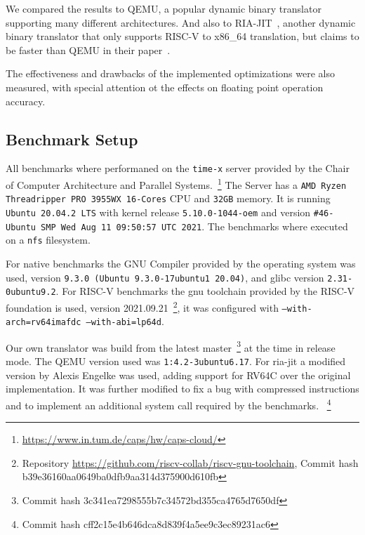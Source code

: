 \documentclass[course=eragp]{aspdoc}
\begin{document}
\par

We compared the results to QEMU, a popular dynamic binary translator supporting many different architectures.
And also to RIA-JIT~\cite{ria_jit_repo}, another dynamic binary translator that only supports RISC-V to x86\_64 translation, but claims to be faster than QEMU in their paper~\cite{ria_jit_paper}.

\par

The effectiveness and drawbacks of the implemented optimizations were also measured, with special attention ot the effects on floating point operation accuracy.

\subsection{Benchmark Setup}

All benchmarks where performaned on the \texttt{time-x} server provided by the Chair of Computer Architecture and Parallel Systems.~\footnote{\url{https://www.in.tum.de/caps/hw/caps-cloud/}} %
The Server has a \texttt{AMD Ryzen Threadripper PRO 3955WX 16-Cores} CPU and \texttt{32GB} memory.
It is running \texttt{Ubuntu 20.04.2 LTS} with kernel release \texttt{5.10.0-1044-oem} and version \texttt{\#46-Ubuntu SMP Wed Aug 11 09:50:57 UTC 2021}.
The benchmarks where executed on a \texttt{nfs} filesystem.

For native benchmarks the GNU Compiler provided by the operating system was used,
version \texttt{9.3.0 (Ubuntu 9.3.0-17ubuntu1~20.04)}, and glibc version \texttt{2.31-0ubuntu9.2}.
For RISC-V benchmarks the gnu toolchain provided by the RISC-V foundation is used, version 2021.09.21~\footnote{Repository \url{https://github.com/riscv-collab/riscv-gnu-toolchain}, Commit hash b39e36160aa0649ba0dfb9aa314d375900d610fb},
it was configured with \texttt{--with-arch=rv64imafdc --with-abi=lp64d}.

\par

Our own translator was build from the latest master~\footnote{Commit hash 3c341ea7298555b7c34572bd355ca4765d7650df} at the time in release mode.
The QEMU version used was \texttt{1:4.2-3ubuntu6.17}.
For ria-jit a modified version by Alexis Engelke was used, adding support for RV64C over the original implementation.
It was further modified to fix a bug with compressed instructions and to implement an additional system call required by the benchmarks.
~\footnote{Commit hash cff2c15e4b646dca8d839f4a5ee9c3ec89231ac6}
\end{document}
